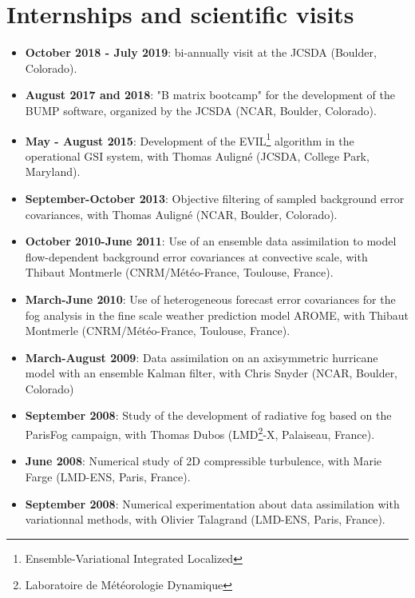 \documentclass[a4paper,9pt]{scrreprt}
\begin{document}
\section*{Internships and scientific visits}
\begin{itemize}
\item \textbf{October 2018 - July 2019}: bi-annually visit at the JCSDA (Boulder, Colorado).
\item \textbf{August 2017 and 2018}: "B matrix bootcamp" for the development of the BUMP software, organized by the JCSDA (NCAR, Boulder, Colorado).\vspace{-0.1cm}
\item \textbf{May - August 2015}: Development of the EVIL\footnote{Ensemble-Variational Integrated Localized} algorithm in the operational GSI system, with Thomas Auligné (JCSDA, College Park, Maryland).\vspace{-0.1cm}
\item \textbf{September-October 2013}: Objective filtering of sampled background error covariances, with Thomas Auligné (NCAR, Boulder, Colorado).\vspace{-0.1cm}
\item \textbf{October 2010-June 2011}: Use of an ensemble data assimilation to model flow-dependent background error covariances at convective scale, with Thibaut Montmerle (CNRM/Météo-France, Toulouse, France).\vspace{-0.1cm}
\item \textbf{March-June 2010}: Use of heterogeneous forecast error covariances for the fog analysis in the fine scale weather prediction model AROME, with Thibaut Montmerle (CNRM/Météo-France, Toulouse, France).\vspace{-0.1cm}
\item \textbf{March-August 2009}: Data assimilation on an axisymmetric hurricane model with an ensemble Kalman filter, with Chris Snyder (NCAR, Boulder, Colorado)\vspace{-0.1cm}
\item \textbf{September 2008}: Study of the development of radiative fog based on the ParisFog campaign, with Thomas Dubos (LMD\footnote{Laboratoire de Météorologie Dynamique}-X, Palaiseau, France).\vspace{-0.1cm}
\item \textbf{June 2008}: Numerical study of 2D compressible turbulence, with Marie Farge (LMD-ENS, Paris, France).\vspace{-0.1cm}
\item \textbf{September 2008}: Numerical experimentation about data assimilation with variationnal methods, with Olivier Talagrand (LMD-ENS, Paris, France).
\end{itemize}
\end{document}
